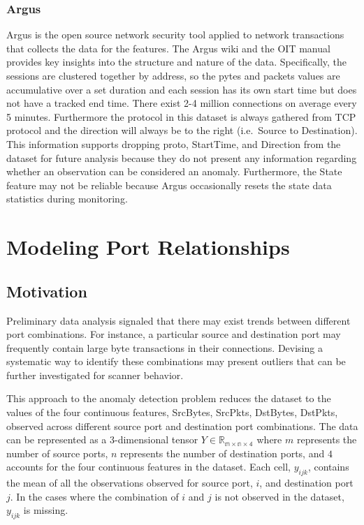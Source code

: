 \documentclass[12pt,twoside]{dukestatscithesis}
\theoremstyle{definition}
\theoremstyle{definition}
\theoremstyle{definition}
\theoremstyle{remark}
\begin{document}
\subsection{Argus}\label{argus}

Argus is the open source network security tool applied to network
transactions that collects the data for the features. The Argus wiki and
the OIT manual provides key insights into the structure and nature of
the data. Specifically, the sessions are clustered together by address,
so the pytes and packets values are accumulative over a set duration and
each session has its own start time but does not have a tracked end
time. There exist 2-4 million connections on average every 5 minutes.
Furthermore the protocol in this dataset is always gathered from TCP
protocol and the direction will always be to the right (i.e.~Source to
Destination). This information supports dropping proto, StartTime, and
Direction from the dataset for future analysis because they do not
present any information regarding whether an observation can be
considered an anomaly. Furthermore, the State feature may not be
reliable because Argus occasionally resets the state data statistics
during monitoring.

\chapter{Modeling Port Relationships}\label{modeling-port-relationships}

\section{Motivation}\label{motivation}

Preliminary data analysis signaled that there may exist trends between
different port combinations. For instance, a particular source and
destination port may frequently contain large byte transactions in their
connections. Devising a systematic way to identify these combinations
may present outliers that can be further investigated for scanner
behavior.

This approach to the anomaly detection problem reduces the dataset to
the values of the four continuous features, SrcBytes, SrcPkts, DstBytes,
DstPkts, observed across different source port and destination port
combinations. The data can be represented as a 3-dimensional tensor
\(Y \in \mathbb{R_{m \times n \times 4}}\) where \(m\) represents the
number of source ports, \(n\) represents the number of destination
ports, and \(4\) accounts for the four continuous features in the
dataset. Each cell, \(y_{ijk}\), contains the mean of all the
observations observed for source port, \(i\), and destination port
\(j\). In the cases where the combination of \(i\) and \(j\) is not
observed in the dataset, \(y_{ijk}\) is missing.
\end{document}

